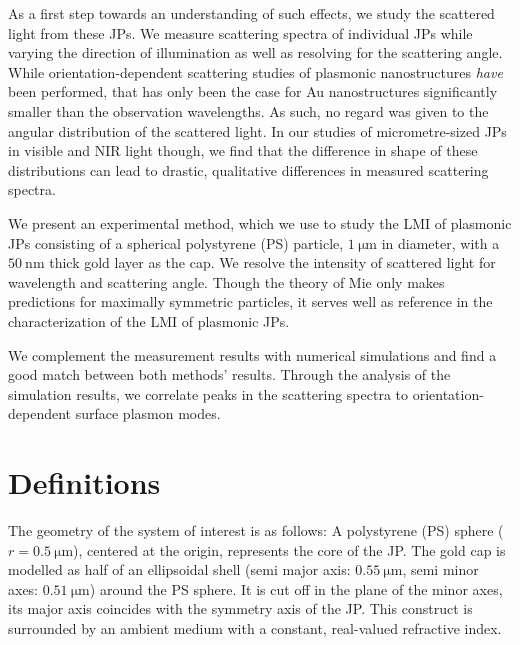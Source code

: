 \documentclass[10pt]{article}
\begin{document}
\begin{multicols}{2}
As a first step towards an understanding of such effects, we study the scattered light from these JPs. 
We measure scattering spectra of individual JPs while varying the direction of illumination as well as resolving for the scattering angle. 
While orientation-dependent scattering studies of plasmonic nanostructures %
\emph{have} been performed, \cite{Islam2021} %
that has only been the case for Au nanostructures significantly smaller than the observation wavelengths. 
As such, no regard was given to the angular distribution of the scattered light.%
In our studies of micrometre-sized JPs in visible and NIR light though, we find that the difference in shape of these distributions can lead to drastic, qualitative differences in measured scattering spectra. 

We present an experimental method, which we use to study the LMI of plasmonic JPs consisting of a spherical polystyrene (PS) particle, $\SI{1}{\micro\meter}$ in diameter, with a $\SI{50}{\nano\meter}$ thick gold layer as the cap. 
We resolve the intensity of scattered light for wavelength and scattering angle. 
Though the theory of Mie \cite{Mie1908} only makes predictions for maximally symmetric particles, it serves well as reference in the characterization of the LMI of plasmonic JPs. 

We complement the measurement results with numerical simulations and find a good match between both methods' results. 
Through the analysis of the simulation results, we correlate peaks in the scattering spectra to orientation-dependent surface plasmon modes. 




\section*{Definitions}


The geometry of the system of interest is as follows: 
A polystyrene (PS) sphere ($r=\SI{0.5}{\micro\meter}$), centered at the origin, represents the core of the JP. 
The gold cap is modelled as half of an ellipsoidal shell (semi major axis: $\SI{0.55}{\micro\meter}$, semi minor axes: $\SI{0.51}{\micro\meter}$) around the PS sphere. 
It is cut off in the plane of the minor axes, its major axis coincides with the symmetry axis of the JP. 
This construct is surrounded by an ambient medium with a constant, real-valued refractive index.  


\end{multicols}
\end{document}
